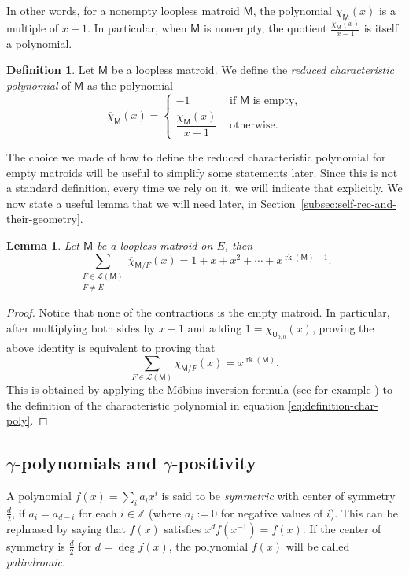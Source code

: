 \documentclass[11pt, a4paper, english]{amsart}
\theoremstyle{teoremas}
\newtheorem{lemma}[theorem]{Lemma}
\theoremstyle{definition}
\newtheorem{definition}[theorem]{Definition}
\DeclareMathOperator{\rk}{rk}
\newcommand{\M}{\mathsf{M}}
\newcommand{\U}{\mathsf{U}}
\begin{document}
In other words, for a nonempty loopless matroid $\M$, the polynomial $\chi_{\M}(x)$ is a multiple of $x-1$. In particular, when $\M$ is nonempty, the quotient $\frac{\chi_{\M}(x)}{x-1}$ is itself a polynomial.

\begin{definition}
    Let $\M$ be a loopless matroid. We define the \emph{reduced characteristic polynomial} of $\M$ as the polynomial
    \[ \overline{\chi}_{\M}(x) = 
    \begin{cases} -1 & \text{ if $\M$ is empty,}\\
    \dfrac{\chi_{\M}(x)}{x-1} & \text{ otherwise.}
    \end{cases}\]
\end{definition}

The choice we made of how to define the reduced characteristic polynomial for empty matroids will be useful to simplify some statements later. Since this is not a standard definition, every time we rely on it, we will indicate that explicitly. We now state a useful lemma that we will need later, in Section~\ref{subsec:self-rec-and-their-geometry}.

\begin{lemma}\label{lemma:sum-reduced-char-poly-contractions}
    Let $\M$ be a loopless matroid on $E$, then
    \[ \sum_{\substack{F\in \mathcal{L}(\M)\\F\neq E}} \overline{\chi}_{\M/F}(x) = 1 + x + x^2 + \cdots + x^{\rk(\M) - 1}.\]
\end{lemma}

\begin{proof}
    Notice that none of the contractions is the empty matroid. In particular, after multiplying both sides by $x-1$ and adding $1 = \chi_{\U_{0,0}}(x)$, proving the above identity is equivalent to proving that \[\sum_{F\in \mathcal{L}(\M)} \chi_{\M/F}(x) = x^{\rk(\M)}.\]
    This is obtained by applying the M\"obius inversion formula (see for example \cite[Proposition~3.7.2]{stanley-ec1}) to the definition of the characteristic polynomial in equation \eqref{eq:definition-char-poly}.
\end{proof}




\subsection{\texorpdfstring{$\gamma$}{gamma}-polynomials and \texorpdfstring{$\gamma$}{gamma}-positivity}

A polynomial $f(x) = \sum_i a_i x^i$ is said to be \emph{symmetric} with center of symmetry $\frac{d}{2}$, if $a_i = a_{d-i}$ for each $i\in \mathbb{Z}$ (where $a_i := 0$ for negative values of $i$). This can be rephrased by saying that $f(x)$ satisfies $x^df(x^{-1})=f(x)$. If the center of symmetry is $\frac{d}{2}$ for $d=\deg f(x)$, the polynomial $f(x)$ will be called  \emph{palindromic}.
\end{document}
